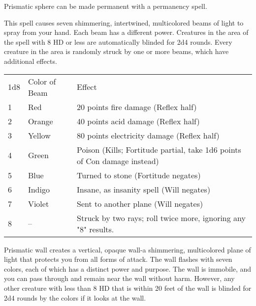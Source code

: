 \begin{multicols}{2}
\begin{small}
\smallskip\noindent Prismatic sphere can be made permanent with a permanency spell.

\noindent This spell causes seven shimmering, intertwined, multicolored beams of light to spray from your hand. Each beam has a different power. Creatures in the area of the spell with 8 HD or less are automatically blinded for 2d4 rounds. Every creature in the area is randomly struck by one or more beams, which have additional effects.

\begin{center}
\begin{tabular}[h!]{l|l|p{1.75in}}
1d8 & Color of Beam & Effect \\
1 & Red    & 20 points fire damage (Reflex half) \\
2 & Orange & 40 points acid damage (Reflex half) \\
3 & Yellow & 80 points electricity damage (Reflex half) \\	   
4 & Green  & Poison (Kills; Fortitude partial, take 1d6 points of Con damage instead) \\
5 & Blue   & Turned to stone (Fortitude negates) \\	   
6 & Indigo & Insane, as insanity spell (Will negates) \\
7 & Violet & Sent to another plane (Will negates) \\
8 & --     & Struck by two rays; roll twice more, ignoring any "8" results. \\
\end{tabular}
\end{center}

\noindent Prismatic wall creates a vertical, opaque wall-a shimmering, multicolored plane of light that protects you from all forms of attack. The wall flashes with seven colors, each of which has a distinct power and purpose. The wall is immobile, and you can pass through and remain near the wall without harm. However, any other creature with less than 8 HD that is within 20 feet of the wall is blinded for 2d4 rounds by the colors if it looks at the wall.


\end{small}
\end{multicols}

